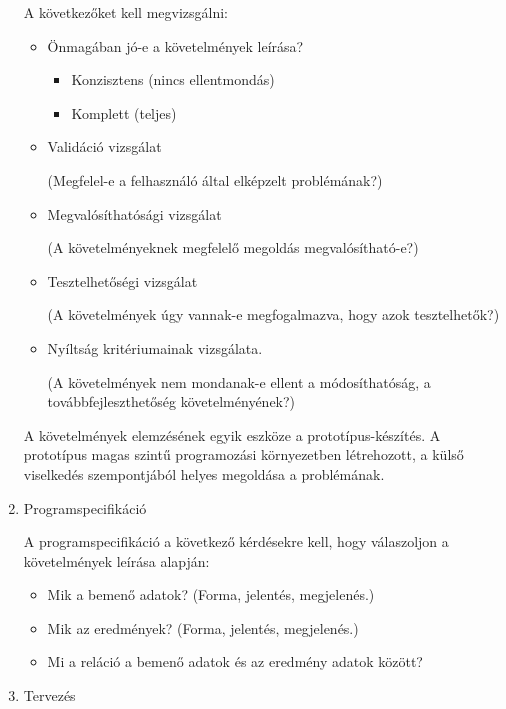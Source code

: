 \documentclass[margin=0px]{article}
\begin{document}
\begin{enumerate}
          A következőket kell megvizsgálni:
          \begin{itemize}
              \item Önmagában jó-e a követelmények leírása?
                    \begin{itemize}
                        \item Konzisztens (nincs ellentmondás)
                        \item Komplett (teljes)
                    \end{itemize}
              \item Validáció vizsgálat

                    (Megfelel-e a felhasználó által elképzelt problémának?)

              \item Megvalósíthatósági vizsgálat

                    (A követelményeknek megfelelő megoldás megvalósítható-e?)

              \item Tesztelhetőségi vizsgálat

                    (A követelmények úgy vannak-e megfogalmazva, hogy azok tesztelhetők?)

              \item Nyíltság kritériumainak vizsgálata.

                    (A követelmények nem mondanak-e ellent a módosíthatóság, a továbbfejleszthetőség
                    követelményének?)
          \end{itemize}

          A követelmények elemzésének egyik eszköze a prototípus-készítés.
          A prototípus magas szintű programozási környezetben létrehozott, a
          külső viselkedés szempontjából helyes megoldása a problémának.
    \item Programspecifikáció

          A programspecifikáció a következő kérdésekre kell, hogy válaszoljon a
          követelmények leírása alapján:

          \begin{itemize}
              \item Mik a bemenő adatok? (Forma, jelentés, megjelenés.)
              \item Mik az eredmények? (Forma, jelentés, megjelenés.)
              \item Mi a reláció a bemenő adatok és az eredmény adatok között?
          \end{itemize}
    \item Tervezés


\end{enumerate}
\end{document}
